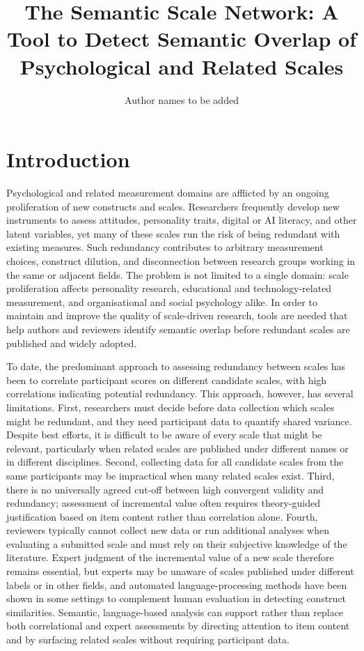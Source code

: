 \documentclass[11pt]{article}
\title{The Semantic Scale Network: A Tool to Detect Semantic Overlap of Psychological and Related Scales}
\author{Author names to be added}
\date{}
\begin{document}
\maketitle

\section{Introduction}

Psychological and related measurement domains are afflicted by an ongoing proliferation of new constructs and scales. Researchers frequently develop new instruments to assess attitudes, personality traits, digital or AI literacy, and other latent variables, yet many of these scales run the risk of being redundant with existing measures. Such redundancy contributes to arbitrary measurement choices, construct dilution, and disconnection between research groups working in the same or adjacent fields. The problem is not limited to a single domain: scale proliferation affects personality research, educational and technology-related measurement, and organisational and social psychology alike. In order to maintain and improve the quality of scale-driven research, tools are needed that help authors and reviewers identify semantic overlap before redundant scales are published and widely adopted.

To date, the predominant approach to assessing redundancy between scales has been to correlate participant scores on different candidate scales, with high correlations indicating potential redundancy. This approach, however, has several limitations. First, researchers must decide before data collection which scales might be redundant, and they need participant data to quantify shared variance. Despite best efforts, it is difficult to be aware of every scale that might be relevant, particularly when related scales are published under different names or in different disciplines. Second, collecting data for all candidate scales from the same participants may be impractical when many related scales exist. Third, there is no universally agreed cut-off between high convergent validity and redundancy; assessment of incremental value often requires theory-guided justification based on item content rather than correlation alone. Fourth, reviewers typically cannot collect new data or run additional analyses when evaluating a submitted scale and must rely on their subjective knowledge of the literature. Expert judgment of the incremental value of a new scale therefore remains essential, but experts may be unaware of scales published under different labels or in other fields, and automated language-processing methods have been shown in some settings to complement human evaluation in detecting construct similarities. Semantic, language-based analysis can support rather than replace both correlational and expert assessments by directing attention to item content and by surfacing related scales without requiring participant data.
\end{document}
